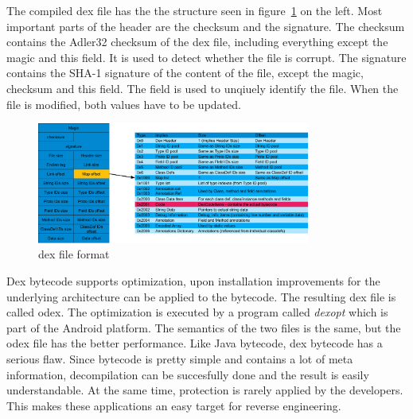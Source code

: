 The compiled \gls{dex} file has the the structure seen in figure~\ref{fig:dex} on the left.
Most important parts of the header are the checksum and the signature.
The checksum contains the Adler32 checksum of the \gls{dex} file, including everything except the magic and this field.
It is used to detect whether the file is corrupt.
The signature contains the SHA-1 signature of the content of the file, except the magic, checksum and this field.
The field is used to unqiuely identify the file.
When the file is modified, both values have to be updated.
\cite{developersDalvik} \cite{ehringerDalvik}
\newline
\begin{figure}[h]
    \centering
    \includegraphics[width=0.8\textwidth]{data/dex.png}
    \caption{\gls{dex} file format \cite{andevconDalvikART}}
    \label{fig:dex}
\end{figure}
Dex bytecode supports optimization, upon installation improvements for the underlying architecture can be applied to the bytecode.
The resulting \gls{dex} file is called \gls{odex}.
The optimization is executed by a program called \textit{dexopt} which is part of the Android platform.
The semantics of the two files is the same, but the \gls{odex} file has the better performance.
\newline
Like Java bytecode, \gls{dex} bytecode has a serious flaw.
Since bytecode is pretty simple and contains a lot of meta information, decompilation can be succesfully done and the result is easily understandable.
At the same time, protection is rarely applied by the developers.
This makes these applications an easy target for reverse engineering.
